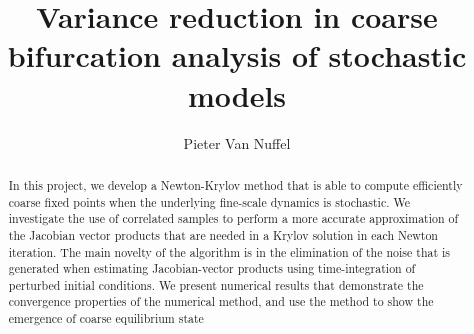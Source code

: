 \documentclass[]{article}
\title{Variance reduction in coarse bifurcation analysis of stochastic models}
\author{Pieter Van Nuffel}
\theoremstyle{definition}
\begin{document}
\maketitle{}

\begin{abstract}


In this project, we develop a Newton-Krylov method that is able to compute efficiently coarse fixed points when the underlying fine-scale dynamics is stochastic. We investigate the use of correlated samples to perform a more accurate approximation of the Jacobian vector products that are needed in a Krylov solution in each Newton iteration. The main novelty of the algorithm is in the elimination of the noise that is generated when estimating Jacobian-vector products using time-integration of perturbed initial conditions. We present numerical results that demonstrate the convergence properties of the numerical method, and use the method to show   the emergence of coarse equilibrium state









\end{abstract}
\end{document}
